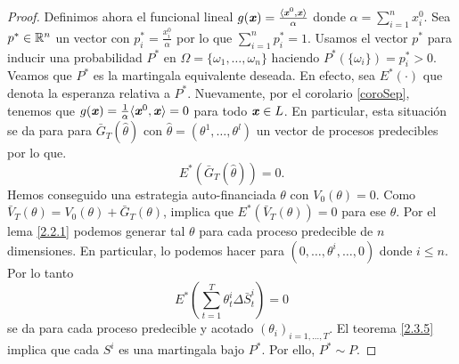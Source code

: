 \begin{proof}
	Definimos ahora el funcional lineal $ g(\textbf{\emph{x}}) = \frac{\langle \textbf{\emph{x}}^0, \textbf{\emph{x}}\rangle}{\alpha} $ donde $ \alpha = \sum_{i=1}^{n} x^0_i$. Sea $ p^* \in \mathbb{R}^n$ un vector con $ p^*_i = \frac{x_i^0}{\alpha} $ por lo que $ \sum_{i=1}^{n} p^*_i = 1 $. Usamos el vector $ p^* $ para inducir una probabilidad $ P^* $ en $ \Omega = \{\omega_1,\dots,\omega_n\} $ haciendo $ P^*(\{\omega_i\}) = p^*_{i} > 0 $. Veamos que $ P^* $ es la martingala equivalente deseada. En efecto, sea $ E^*(\cdot) $ que denota la esperanza relativa a $ P^* $. Nuevamente, por el corolario \ref{coroSep}, tenemos que $ g(\textbf{\emph{x}}) = \frac{1}{\alpha}\langle \textbf{\emph{x}}^0,\textbf{\emph{x}}\rangle = 0$ para todo $ \textbf{\emph{x}}\in L $. En particular, esta situación se da para  para $ \bar{G}_T (\hat{\theta}) $ con $ \hat{\theta}=(\theta^1,\dots,\theta^l) $ un vector de procesos predecibles por lo que.
	\[ E^*(\bar{G}_T (\hat{\theta})) = 0.\]
	Hemos conseguido una estrategia auto-financiada $ \theta $ con $ V_0(\theta) = 0 $. Como $ \bar{V}_T (\theta) = V_0(\theta) + \bar{G}_T (\theta)$, implica que $ E^*(\bar{V}_T(\theta)) = 0 $ para ese $ \theta $. Por el lema \ref{2.2.1} podemos generar tal $ \theta $ para cada proceso predecible de $ n $  dimensiones. En particular, lo podemos hacer para $ (0,\dots, \theta^i,\dots,0) $ donde $ i\leq n $. Por lo tanto
	\[
	E^*(\sum_{t=1}^{T}\theta_t^i\Delta \bar{S}^i_t) = 0
	\]
	se da para cada proceso predecible y acotado $ (\theta_i)_{i=1,\dots,T} $. El teorema \ref{2.3.5} implica que cada $ S^i $ es una martingala bajo $ P^* $. Por ello, $ P^* \sim P $.
\end{proof}
\bigskip